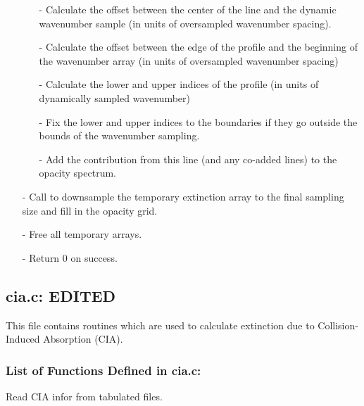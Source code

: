 \documentclass[letterpaper,12pt]{article}
\begin{document}
\begin{enumerate}[leftmargin=10pt, noitemsep, parsep=0pt, topsep=0ex]
\begin{enumerate}[leftmargin=10pt, noitemsep, parsep=0pt, topsep=0ex]
\item[-] Calculate the offset between the center of the line and the dynamic wavenumber sample (in units of oversampled wavenumber spacing).
\item[-] Calculate the offset between the edge of the profile and the beginning of the wavenumber array (in units of oversampled wavenumber spacing)
\item[-] Calculate the lower and upper indices of the profile (in units of dynamically sampled wavenumber)
\item[-] Fix the lower and upper indices to the boundaries if they go outside the bounds of the wavenumber sampling.
\item[-] Add the contribution from this line (and any co-added lines) to the opacity spectrum.
\end{enumerate}
\item[-] Call  to downsample the temporary extinction array to the final sampling size and fill in the opacity grid.
\item[-] Free all temporary arrays.
\item[-] Return 0 on success.
\end{enumerate}

\newpage
\subsection{cia.c: EDITED}
This file contains routines which are used to calculate extinction due to Collision-Induced Absorption (CIA).
\subsubsection{List of Functions Defined in cia.c:}
Read CIA infor from tabulated files. \newline

 \newline

 \newline
\end{document}
